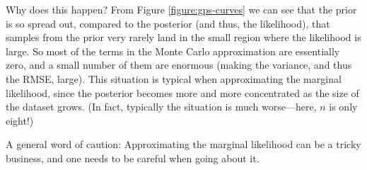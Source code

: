 \documentclass[12pt]{article}
\begin{document}
Why does this happen? From Figure \ref{figure:gps-curves} we can see that the prior is so spread out, compared to the posterior (and thus, the likelihood), that samples from the prior very rarely land in the small region where the likelihood is large.  So most of the terms in the Monte Carlo approximation are essentially zero, and a small number of them are enormous (making the variance, and thus the RMSE, large). This situation is typical when approximating the marginal likelihood, since the posterior becomes more and more concentrated as the size of the dataset grows. (In fact, typically the situation is much worse---here, $n$ is only eight!)

A general word of caution: Approximating the marginal likelihood can be a tricky business, and one needs to be careful when going about it.





\end{document}
